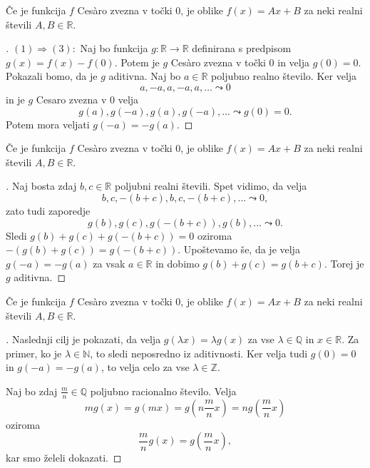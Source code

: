 \documentclass[10]{beamer}
\newenvironment{dokaz}{\begin{proof}[\bfseries\upshape\proofname]}{\end{proof}}
\begin{document}
\begin{frame}
    \begin{block}{}
        Če je funkcija $f$ Ces\`{a}ro zvezna v točki $0$, je oblike $f(x) = Ax + B$ za neki realni števili $A, B \in \mathbb{R}$.
    \end{block}
    \begin{dokaz}\renewcommand{\qedsymbol}{}
        $(1) \Rightarrow (3): $ Naj bo funkcija $g: \mathbb{R} \rightarrow \mathbb{R}$ definirana s predpisom $g(x) = f(x) - f(0)$. Potem je $g$ Ces\`{a}ro zvezna v točki $0$ in velja $g(0) = 0$. Pokazali bomo, da je $g$ aditivna.
        \pause
        Naj bo $a \in \mathbb{R}$ poljubno realno število. Ker velja $$a, -a, a, -a, a, \ldots \leadsto 0$$ in je $g$ Cesaro zvezna v $0$ velja $$g(a), g(-a), g(a), g(-a), \ldots \leadsto g(0) = 0.$$ 
        \pause 
        Potem mora veljati $g(-a) = -g(a)$. 
    \end{dokaz}
\end{frame}

\begin{frame}
    \begin{block}{}
        Če je funkcija $f$ Ces\`{a}ro zvezna v točki $0$, je oblike $f(x) = Ax + B$ za neki realni števili $A, B \in \mathbb{R}$.
    \end{block}
    \begin{dokaz}\renewcommand{\qedsymbol}{}
        Naj bosta zdaj $b, c \in \mathbb{R}$ poljubni realni števili. Spet vidimo, da velja 
        $$b, c, -(b+c), b, c, -(b+c), \ldots \leadsto 0,$$ zato tudi zaporedje $$g(b), g(c), g(-(b+c)), g(b), \ldots \leadsto 0.$$
        \pause
        Sledi $g(b) + g(c) + g(-(b+c)) = 0$ oziroma $-(g(b) + g(c)) = g(-(b+c))$. 
        \pause 
        Upoštevamo še, da je velja $g(-a) = -g(a)$ za vsak $a \in \mathbb{R}$ in dobimo $g(b) + g(c) = g(b+c)$. Torej je $g$ aditivna.
    \end{dokaz}
\end{frame}

\begin{frame}
    \begin{block}{}
        Če je funkcija $f$ Ces\`{a}ro zvezna v točki $0$, je oblike $f(x) = Ax + B$ za neki realni števili $A, B \in \mathbb{R}$.
    \end{block}
    \begin{dokaz}\renewcommand{\qedsymbol}{}
        Naslednji cilj je pokazati, da velja $g(\lambda x) = \lambda g(x)$ za vse $\lambda \in \mathbb{Q}$ in $x \in \mathbb{R}$. Za primer, ko je $\lambda \in \mathbb{N}$, to sledi neposredno iz aditivnosti. Ker velja tudi $g(0) = 0$ in $g(-a) = -g(a)$, to velja celo za vse $\lambda \in \mathbb{Z}$. 
        \pause

        Naj bo zdaj $\frac{m}{n} \in \mathbb{Q}$ poljubno racionalno število. Velja 
        $$mg(x) = g(mx) = g(n\frac{m}{n}x) = ng(\frac{m}{n}x)$$ 
        oziroma 
        $$\frac{m}{n}g(x) = g(\frac{m}{n}x),$$ 
        kar smo želeli dokazati.
    \end{dokaz}
\end{frame}
\end{document}
